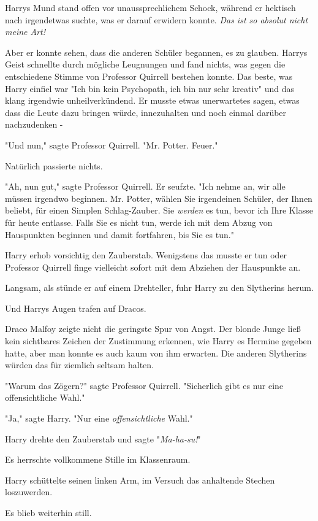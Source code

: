 {Harrys Mund stand offen vor unaussprechlichem Schock, während er hektisch nach irgendetwas suchte, was er darauf erwidern konnte. \emph{Das ist so absolut nicht meine Art!}

Aber er konnte sehen, dass die anderen Schüler begannen, es zu glauben. Harrys Geist schnellte durch mögliche Leugnungen und fand nichts, was gegen die entschiedene Stimme von Professor Quirrell bestehen konnte. Das beste, was Harry einfiel war "Ich bin kein Psychopath, ich bin nur sehr kreativ" und das klang irgendwie unheilverkündend. Er musste etwas unerwartetes sagen, etwas dass die Leute dazu bringen würde, innezuhalten und noch einmal darüber nachzudenken -

"Und nun," sagte Professor Quirrell. "Mr. Potter. Feuer."

Natürlich passierte nichts.

"Ah, nun gut," sagte Professor Quirrell. Er seufzte. "Ich nehme an, wir alle müssen irgendwo beginnen. Mr. Potter, wählen Sie irgendeinen Schüler, der Ihnen beliebt, für einen Simplen Schlag-Zauber. Sie \emph{werden} es tun, bevor ich Ihre Klasse für heute entlasse. Falls Sie es nicht tun, werde ich mit dem Abzug von Hauspunkten beginnen und damit fortfahren, bis Sie es tun."

Harry erhob vorsichtig den Zauberstab. Wenigstens das musste er tun oder Professor Quirrell finge vielleicht sofort mit dem Abziehen der Hauspunkte an.

Langsam, als stünde er auf einem Drehteller, fuhr Harry zu den Slytherins herum.

Und Harrys Augen trafen auf Dracos.

Draco Malfoy zeigte nicht die geringste Spur von Angst. Der blonde Junge ließ kein sichtbares Zeichen der Zustimmung erkennen, wie Harry es Hermine gegeben hatte, aber man konnte es auch kaum von ihm erwarten. Die anderen Slytherins würden das für ziemlich seltsam halten.

"Warum das Zögern?" sagte Professor Quirrell. "Sicherlich gibt es nur eine offensichtliche Wahl."

"Ja," sagte Harry. "Nur eine \emph{offensichtliche} Wahl."

Harry drehte den Zauberstab und sagte "\emph{Ma-ha-su!}"

Es herrschte vollkommene Stille im Klassenraum.

Harry schüttelte seinen linken Arm, im Versuch das anhaltende Stechen loszuwerden.

Es blieb weiterhin still.

}
